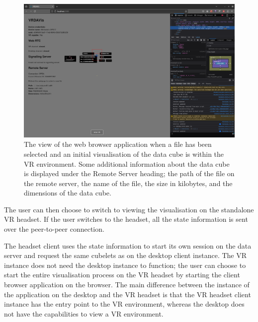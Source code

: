 \begin{figure}
    \centering
    \includegraphics[width=\linewidth]{figures/screenshots/5.png}
    \caption{The view of the web browser application when a file has been selected and an initial visualisation of the data cube is within the VR environment. Some additional information about the data cube is displayed under the Remote Server heading; the path of the file on the remote server, the name of the file, the size in kilobytes, and the dimensions of the data cube.}
    \label{fig:screenshot-5}
\end{figure}

The user can then choose to switch to viewing the visualisation on the standalone VR headset. 
If the user switches to the headset, all the state information is sent over the peer-to-peer connection. 

The headset client uses the state information to start its own session on the data server and request the same cubelets as on the desktop client instance. 
The VR instance does not need the desktop instance to function; the user can choose to start the entire visualisation process on the VR headset by starting the client browser application on the browser. 
The main difference between the instance of the application on the desktop and the VR headset is that the VR headset client instance has the entry point to the VR environment, whereas the desktop does not have the capabilities to view a VR environment.

